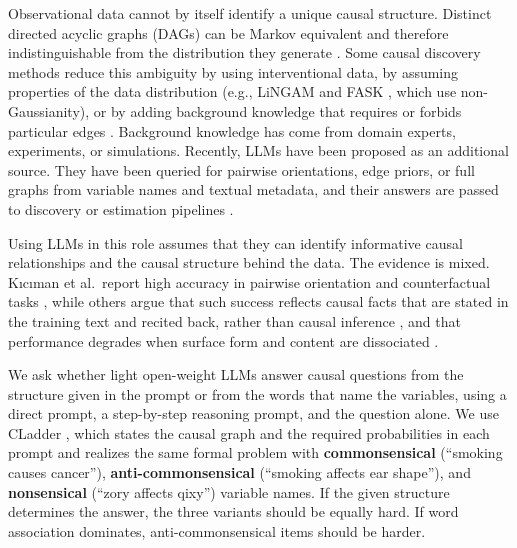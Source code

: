 \documentclass{llncs}
\begin{document}
Observational data cannot by itself identify a unique causal structure. Distinct directed acyclic graphs (DAGs) can be Markov equivalent and therefore indistinguishable from the distribution they generate \cite{verma1990equivalence,spirtes2000causation,glymour2019review}. Some causal discovery methods reduce this ambiguity by using interventional data, by assuming properties of the data distribution (e.g., LiNGAM \cite{shimizu2006linear} and FASK \cite{sanchez2019estimating}, which use non-Gaussianity), or by adding background knowledge that requires or forbids particular edges \cite{spirtes2016causal}. Background knowledge has come from domain experts, experiments, or simulations. Recently, LLMs have been proposed as an additional source. They have been queried for pairwise orientations, edge priors, or full graphs from variable names and textual metadata, and their answers are passed to discovery or estimation pipelines \cite{long2023can,kiciman2023causal,zhang2023understanding,verma2025causal}.

Using LLMs in this role assumes that they can identify informative causal relationships and the causal structure behind the data. The evidence is mixed. Kıcıman et al.\ report high accuracy in pairwise orientation and counterfactual tasks \cite{kiciman2023causal}, while others argue that such success reflects causal facts that are stated in the training text and recited back, rather than causal inference \cite{willig2022can,Zecevic2023CausalPL}, and that performance degrades when surface form and content are dissociated \cite{hobbhahn2022investigating,li2023counterfactual,chen2024clear}.

We ask whether light open-weight LLMs answer causal questions from the structure given in the prompt or from the words that name the variables, using a direct prompt, a step-by-step reasoning prompt, and the question alone. We use CLadder \cite{jin2023cladder}, which states the causal graph and the required probabilities in each prompt and realizes the same formal problem with \textbf{\textcolor{cComm}{commonsensical}} (``smoking causes cancer''), \textbf{\textcolor{cAnti}{anti-commonsensical}} (``smoking affects ear shape''), and \textbf{\textcolor{cNons}{nonsensical}} (``zory affects qixy'') variable names. If the given structure determines the answer, the three variants should be equally hard. If word association dominates, anti-commonsensical items should be harder.
\end{document}
